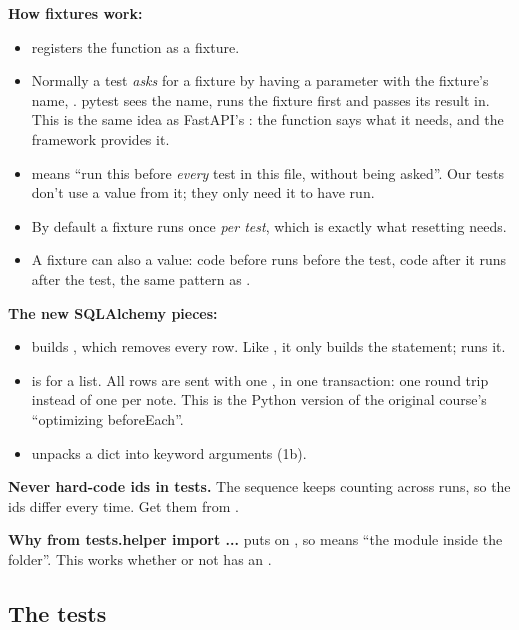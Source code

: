 \textbf{How fixtures work:}
\begin{itemize}
\item {} registers the function as a fixture.
\item Normally a test \emph{asks} for a fixture by having a parameter with the fixture's name, . pytest sees the name, runs the fixture first and passes its result in. This is the same idea as FastAPI's : the function says what it needs, and the framework provides it.
\item {} means ``run this before \emph{every} test in this file, without being asked''. Our tests don't use a value from it; they only need it to have run.
\item By default a fixture runs once \emph{per test}, which is exactly what resetting needs.
\item A fixture can also  a value: code before  runs before the test, code after it runs after the test, the same pattern as .
\end{itemize}

\textbf{The new SQLAlchemy pieces:}
\begin{itemize}
\item {} builds , which removes every row. Like , it only builds the statement;  runs it.
\item {} is  for a list. All rows are sent with one , in one transaction: one round trip instead of one per note. This is the Python version of the original course's ``optimizing beforeEach''.
\item {} unpacks a dict into keyword arguments (1b).
\end{itemize}

\textbf{Never hard-code ids in tests.} The sequence keeps counting across runs, so the ids differ every time. Get them from .

\textbf{Why from tests.helper import ...}  puts  on , so  means ``the  module inside the  folder''. This works whether or not  has an .

\subsection{The tests}

